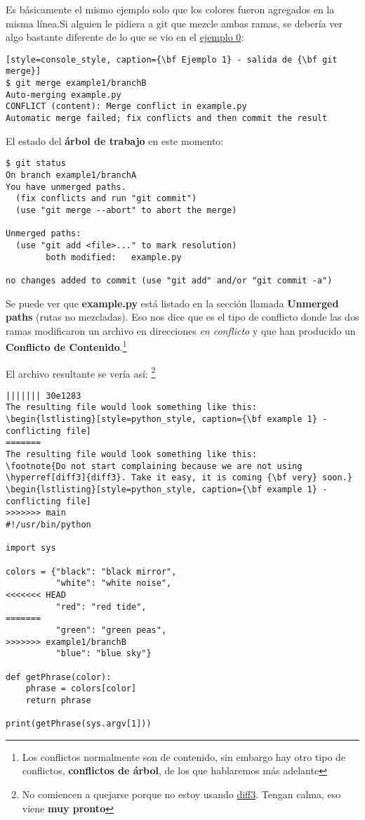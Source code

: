 Es básicamente el mismo ejemplo solo que los colores fueron agregados en la misma línea.Si alguien le pidiera a git
que mezcle ambas ramas, se debería ver algo bastante diferente de lo que se vio en el \hyperref[example_00]{ejemplo 0}:

\begin{lstlisting}[style=console_style, caption={\bf Ejemplo 1} - salida de {\bf git merge}]
$ git merge example1/branchB
Auto-merging example.py
CONFLICT (content): Merge conflict in example.py
Automatic merge failed; fix conflicts and then commit the result
\end{lstlisting}

El estado del {\bf árbol de trabajo} en este momento:
\begin{lstlisting}[style=console_style, caption={\bf Ejemplo 1} - git status]
$ git status
On branch example1/branchA
You have unmerged paths.
  (fix conflicts and run "git commit")
  (use "git merge --abort" to abort the merge)

Unmerged paths:
  (use "git add <file>..." to mark resolution)
        both modified:   example.py

no changes added to commit (use "git add" and/or "git commit -a")
\end{lstlisting}

Se puede ver que {\bf example.py} está listado en la sección llamada {\bf Unmerged paths} (rutas no mezcladas). Eso nos dice que
es el tipo de conflicto donde las dos ramas modificaron un archivo en direcciones {\it en conflicto} y que han producido un
{\bf Conflicto de Contenido}.\footnote{Los conflictos normalmente son de contenido, sin embargo hay otro tipo de conflictos,
{\bf conflictos de árbol}, de los que hablaremos más adelante}

El archivo resultante se vería así:
\footnote{No comiencen a quejarse porque no estoy usando \hyperref[diff3]{diff3}. Tengan calma, eso viene {\bf muy pronto}}
\begin{lstlisting}[style=python_style, caption={\bf Ejemplo 1} - archivo en conflicto]
||||||| 30e1283
The resulting file would look something like this:
\begin{lstlisting}[style=python_style, caption={\bf example 1} - conflicting file]
=======
The resulting file would look something like this:
\footnote{Do not start complaining because we are not using \hyperref[diff3]{diff3}. Take it easy, it is coming {\bf very} soon.}
\begin{lstlisting}[style=python_style, caption={\bf example 1} - conflicting file]
>>>>>>> main
#!/usr/bin/python

import sys

colors = {"black": "black mirror",
          "white": "white noise",
<<<<<<< HEAD
          "red": "red tide",
=======
          "green": "green peas",
>>>>>>> example1/branchB
          "blue": "blue sky"}

def getPhrase(color):
    phrase = colors[color]
    return phrase

print(getPhrase(sys.argv[1]))
\end{lstlisting}

